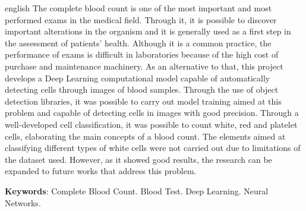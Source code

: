 \documentclass[
	10pt,				%
	oneside,
	a4paper,			%
	chapter=TITLE,		%
	english,			%
	brazil				%
	]{abntex2}
\begin{document}
\begin{resumo}[Abstract]
 \begin{otherlanguage*}{english}
		The complete blood count is one of the most important and most performed exams in the medical field. Through it, it is possible to discover important alterations in the organism and it is generally used as a first step in the assessment of patients' health. Although it is a common practice, the performance of exams is difficult in laboratories because of the high cost of purchase and maintenance machinery. As an alternative to that, this project develops a Deep Learning computational model capable of automatically detecting cells through images of blood samples. Through the use of object detection libraries, it was possible to carry out model training aimed at this problem and capable of detecting cells in images with good precision. Through a well-developed cell classification, it was possible to count white, red and platelet cells, elaborating the main concepts of a blood count. The elements aimed at classifying different types of white cells were not carried out due to limitations of the dataset used. However, as it showed good results, the research can be expanded to future works that address this problem.
		\vspace{\onelineskip}
		\noindent 
						
		\textbf{Keywords}: Complete Blood Count. Blood Test. Deep Learning. Neural Networks.
	\end{otherlanguage*}
\end{resumo}


\listoffigures*
\cleardoublepage
\listoftables*
\cleardoublepage



\cleardoublepage

\end{document}
